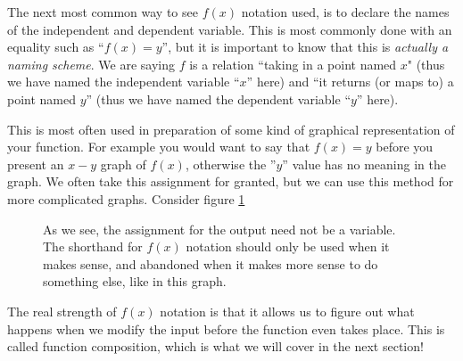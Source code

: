 \documentclass{ximera}
\begin{document}
        The next most common way to see $f(x)$ notation used, is to declare the names of the independent and dependent variable. This is most commonly done with an equality such as ``$f(x) = y$'', but it is important to know that this is \textit{actually a naming scheme}. We are saying $f$ is a relation ``taking in a point named $x$" (thus we have named the independent variable ``$x$'' here) and ``it returns (or maps to) a point named $y$'' (thus we have named the dependent variable ``$y$'' here). 
        
        This is most often used in preparation of some kind of graphical representation of your function. For example you would want to say that $f(x) = y$ before you present an $x-y$ graph of $f(x)$, otherwise the ''$y$'' value has no meaning in the graph. We often take this assignment for granted, but we can use this method for more complicated graphs. Consider figure \ref{profitProjections}
        
        \begin{figure}[h]
            \begin{center}
            \end{center}
            \caption{
                As we see, the assignment for the output need not be a variable. The shorthand for $f(x)$ notation should only be used when it makes sense, and abandoned when it makes more sense to do something else, like in this graph.
            }
            \label{profitProjections}
        \end{figure}
            
    
    
    The real strength of $f(x)$ notation is that it allows us to figure out what happens when we modify the input before the function even takes place. This is called function composition, which is what we will cover in the next section!
\end{document}
